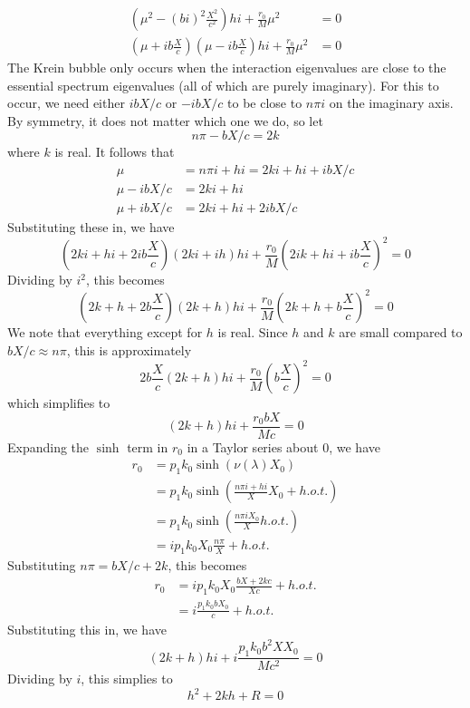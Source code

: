 \documentclass[thesis.tex]{subfiles}
\begin{document}
\begin{align*}
\left(\mu^2 - (bi)^2 \frac{X^2}{c^2} \right) h i + \frac{r_0}{M} \mu^2 &= 0 \\
\left(\mu + i b\frac{X}{c}\right)\left(\mu - i b\frac{X}{c}\right) h i + \frac{r_0}{M} \mu^2 &= 0
\end{align*}
The Krein bubble only occurs when the interaction eigenvalues are close to the essential spectrum eigenvalues (all of which are purely imaginary). For this to occur, we need either $i b X/c$ or $-i b X/c$ to be close to $n \pi i$ on the imaginary axis. By symmetry, it does not matter which one we do, so let
\[
n \pi - b X/c = 2 k
\]
where $k$ is real. It follows that
\begin{align*}
\mu &= n \pi i + h i = 2 k i + h i + i b X/c \\
\mu - i b X/c &= 2 k i + h i\\
\mu + i b X/c &= 2 k i + h i + 2 i b X/c
\end{align*}
Substituting these in, we have
\[
\left(2 k i + h i + 2i b\frac{X}{c}\right)\left(2k i + i h\right) h i + \frac{r_0}{M} \left(2 i k + h i + i b \frac{X}{c}\right)^2 = 0
\]
Dividing by $i^2$, this becomes
\[
\left(2 k + h + 2 b\frac{X}{c}\right)\left(2k + h\right) h i + \frac{r_0}{M} \left(2 k + h + b \frac{X}{c}\right)^2 = 0
\]
We note that everything except for $h$ is real. Since $h$ and $k$ are small compared to $b X/c \approx n \pi$, this is approximately
\[
2 b\frac{X}{c}\left(2k + h\right) h i + \frac{r_0}{M} \left( b \frac{X}{c}\right)^2 = 0
\]
which simplifies to
\[
\left(2k + h\right) h i + \frac{r_0 b X }{M c} = 0
\]
Expanding the $\sinh$ term in $r_0$ in a Taylor series about $0$, we have
\begin{align*}
r_0 &= p_1 k_0 \sinh(\nu(\lambda)X_0) \\
&= p_1 k_0 \sinh\left( \frac{n \pi i + h i}{X} X_0 + h.o.t. \right) \\
&= p_1 k_0 \sinh\left( \frac{n \pi i X_0}{X} h.o.t. \right) \\
&= i p_1 k_0 X_0 \frac{n \pi}{X} + h.o.t.
\end{align*}
Substituting $n \pi = b X/c + 2 k$, this becomes
\begin{align*}
r_0 &= i p_1 k_0 X_0 \frac{b X + 2 k c}{X c} + h.o.t. \\
&= i \frac{p_1 k_0 b X_0}{c} + h.o.t.
\end{align*}
Substituting this in, we have
\[
\left(2k + h\right) h i + i \frac{p_1 k_0 b^2 X X_0 }{M c^2} = 0
\]
Dividing by $i$, this simplies to
\[
h^2 + 2kh + R = 0
\]
\end{document}
